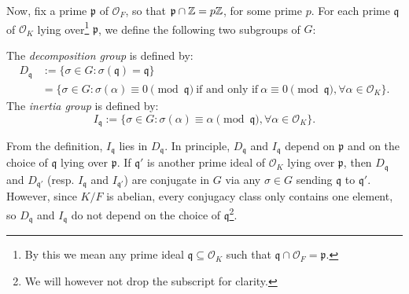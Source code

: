 \documentclass[../main.tex]{subfiles}
\begin{document}
Now, fix a prime $\mathfrak{p}$ of $\mathcal{O}_F$, so that $\mathfrak{p}\cap\mathbb{Z}=p\mathbb{Z}$, for some prime $p$. For each prime $\mathfrak{q}$ of $\mathcal{O}_K$ lying over\footnote{By this we mean any prime ideal $\mathfrak{q}\subseteq\mathcal{O}_K$ such that $\mathfrak{q}\cap\mathcal{O}_F=\mathfrak{p}$.} $\mathfrak{p}$, we define the following two subgroups of $G$:
\begin{definition}
	The \emph{decomposition group} is defined by:
	\begin{align*}
		D_{\mathfrak{q}}&:=\{\sigma\in G: \sigma(\mathfrak{q})=\mathfrak{q}\}\\
		&=\{\sigma\in G: \sigma(\alpha)\equiv 0 \pmod{\mathfrak{q}}\ \text{if and only if} \ \alpha\equiv 0\pmod{\mathfrak{q}}, \forall \alpha\in\mathcal{O}_K\}.
	\end{align*}
The \emph{inertia group} is defined by:
	\begin{equation*}
		I_{\mathfrak{q}}:=\{\sigma\in G: \sigma(\alpha)\equiv \alpha \pmod{\mathfrak{q}}, \forall \alpha\in\mathcal{O}_K\}.
	\end{equation*}
\end{definition}
From the definition, $I_{\mathfrak{q}}$ lies in $D_{\mathfrak{q}}$. In principle, $D_\mathfrak{q}$ and $I_\mathfrak{q}$ depend on $\mathfrak{p}$ and on the choice of $\mathfrak{q}$ lying over $\mathfrak{p}$. If $\mathfrak{q}'$ is another prime ideal of $\mathcal{O}_K$ lying over $\mathfrak{p}$, then $D_{\mathfrak{q}}$ and $D_{\mathfrak{q}'}$ (resp. $I_{\mathfrak{q}}$ and $I_{\mathfrak{q}'}$) are conjugate in $G$ via any $\sigma\in G$ sending $\mathfrak{q}$ to $\mathfrak{q}'$. However, since $K/F$ is abelian, every conjugacy class only contains one element, so $D_\mathfrak{q}$ and $I_\mathfrak{q}$ do not depend on the choice of $\mathfrak{q}$\footnote{We will however not drop the subscript for clarity.}.
\end{document}
